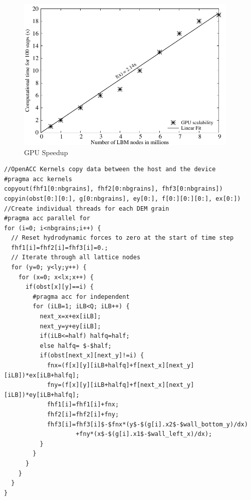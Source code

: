\begin{figure}[tbhp]
	\centering
	\includegraphics[width=0.95\textwidth]{GPU_Speedup}
	\caption{GPU Speedup}
	\label{fig:GPUSpeed}
\end{figure}

\begin{lstlisting}[label=lst:GPU,caption= OpenACC GPU implementation of 
hydrodynamic force computation,style=customcpp]
//OpenACC Kernels copy data between the host and the device
#pragma acc kernels 
copyout(fhf1[0:nbgrains], fhf2[0:nbgrains], fhf3[0:nbgrains]) 
copyin(obst[0:][0:], g[0:nbgrains], ey[0:], f[0:][0:][0:], ex[0:])
//Create individual threads for each DEM grain
#pragma acc parallel for
for (i=0; i<nbgrains;i++) {
  // Reset hydrodynamic forces to zero at the start of time step
  fhf1[i]=fhf2[i]=fhf3[i]=0.;
  // Iterate through all lattice nodes
  for (y=0; y<ly;y++) {
    for (x=0; x<lx;x++) {
      if(obst[x][y]==i) {
        #pragma acc for independent
        for (iLB=1; iLB<Q; iLB++) {
          next_x=x+ex[iLB];
          next_y=y+ey[iLB];
          if(iLB<=half) halfq=half;
          else halfq= $-$half;
          if(obst[next_x][next_y]!=i) {
            fnx=(f[x][y][iLB+halfq]+f[next_x][next_y][iLB])*ex[iLB+halfq];
            fny=(f[x][y][iLB+halfq]+f[next_x][next_y][iLB])*ey[iLB+halfq];
            fhf1[i]=fhf1[i]+fnx;
            fhf2[i]=fhf2[i]+fny;
            fhf3[i]=fhf3[i]$-$fnx*(y$-$(g[i].x2$-$wall_bottom_y)/dx) 
                    +fny*(x$-$(g[i].x1$-$wall_left_x)/dx);
          }			
        }
      }
    }
  }
}
\end{lstlisting}
